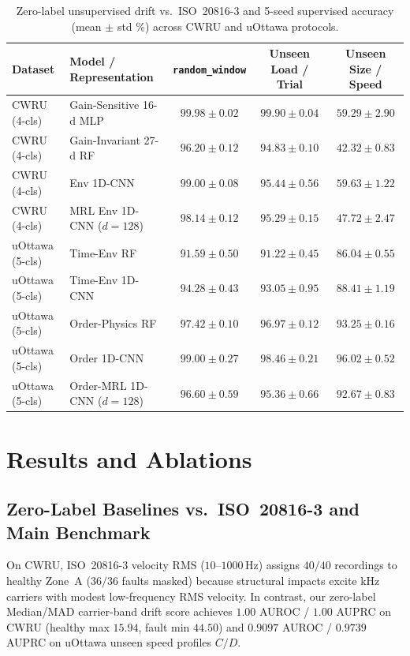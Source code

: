 \documentclass[10pt,twocolumn]{article}
\begin{document}
\begin{table}[t]
\centering
\small
\caption{Zero-label unsupervised drift vs.\ ISO~20816-3 and 5-seed supervised accuracy (mean $\pm$ std \%) across CWRU and uOttawa protocols.}
\begin{tabular}{llccc}
\toprule
Dataset & Model / Representation & \texttt{random\_window} & Unseen Load / Trial & Unseen Size / Speed \\
\midrule
CWRU (4-cls) & Gain-Sensitive 16-d MLP & $99.98 \pm 0.02$ & $99.90 \pm 0.04$ & $59.29 \pm 2.90$ \\
CWRU (4-cls) & Gain-Invariant 27-d RF & $96.20 \pm 0.12$ & $94.83 \pm 0.10$ & $42.32 \pm 0.83$ \\
CWRU (4-cls) & Env 1D-CNN & $99.00 \pm 0.08$ & $95.44 \pm 0.56$ & $59.63 \pm 1.22$ \\
CWRU (4-cls) & MRL Env 1D-CNN ($d=128$) & $98.14 \pm 0.12$ & $95.29 \pm 0.15$ & $47.72 \pm 2.47$ \\
\midrule
uOttawa (5-cls) & Time-Env RF & $91.59 \pm 0.50$ & $91.22 \pm 0.45$ & $86.04 \pm 0.55$ \\
uOttawa (5-cls) & Time-Env 1D-CNN & $94.28 \pm 0.43$ & $93.05 \pm 0.95$ & $88.41 \pm 1.19$ \\
uOttawa (5-cls) & Order-Physics RF & $97.42 \pm 0.10$ & $96.97 \pm 0.12$ & $93.25 \pm 0.16$ \\
uOttawa (5-cls) & Order 1D-CNN & $\mathbf{99.00 \pm 0.27}$ & $\mathbf{98.46 \pm 0.21}$ & $\mathbf{96.02 \pm 0.52}$ \\
uOttawa (5-cls) & Order-MRL 1D-CNN ($d=128$) & $96.60 \pm 0.59$ & $95.36 \pm 0.66$ & $92.67 \pm 0.83$ \\
\bottomrule
\end{tabular}
\label{tab:main}
\end{table}

\section{Results and Ablations}
\subsection{Zero-Label Baselines vs.\ ISO~20816-3 and Main Benchmark}
On CWRU, ISO~20816-3 velocity RMS ($10$--$1000$\,Hz) assigns $40/40$ recordings to healthy Zone~A ($36/36$ faults masked) because structural impacts excite kHz carriers with modest low-frequency RMS velocity. In contrast, our zero-label Median/MAD carrier-band drift score achieves $1.00$ AUROC / $1.00$ AUPRC on CWRU (healthy max $15.94$, fault min $44.50$) and $0.9097$ AUROC / $0.9739$ AUPRC on uOttawa unseen speed profiles $C/D$.
\end{document}
